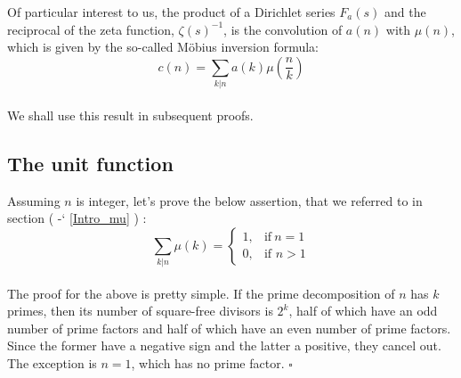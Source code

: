 \documentclass[12pt]{article}
\newcommand*{\secrefe}[1]{%
\begingroup
(\color{Aquamarine}
\romannumeral-`\x %
\setcitestyle{numbers}%
\ref{#1}%
\endgroup
)\ignorespacesafterend
}
\begin{document}
Of particular interest to us, the product of a Dirichlet series $F_a(s)$ and the reciprocal of the zeta function, $\zeta(s)^{-1}$,  is the convolution of $a(n)$ with $\mu(n)$, which is given by the so-called M\"{o}bius inversion formula:
\begin{equation} \label{eq:convo} \nonumber
c(n)=\sum_{k|n}a(k) \mu\left(\frac{n}{k}\right) 
\end{equation}\\
\indent We shall use this result in subsequent proofs.

\subsection{The unit function} \label{Proof1}
Assuming $n$ is integer, let's prove the below assertion, that we referred to in section \secrefe{Intro_mu}:
\begin{equation} \label{eq:test1} \nonumber
\sum_{k|n}\mu(k)=\begin{cases}
      1, & \text{if}\ n=1\\
      0, & \text{if }n>1
\end{cases} 
\end{equation}\\
\indent The proof for the above is pretty simple. If the prime decomposition of $n$ has $k$ primes, then its  number of square-free divisors is $2^k$, half of which have an odd number of prime factors and half of which have an even number of prime factors. Since the former have a negative sign and the latter a positive, they cancel out. The exception is $n=1$, which has no prime factor. $\square$\\
\end{document}

